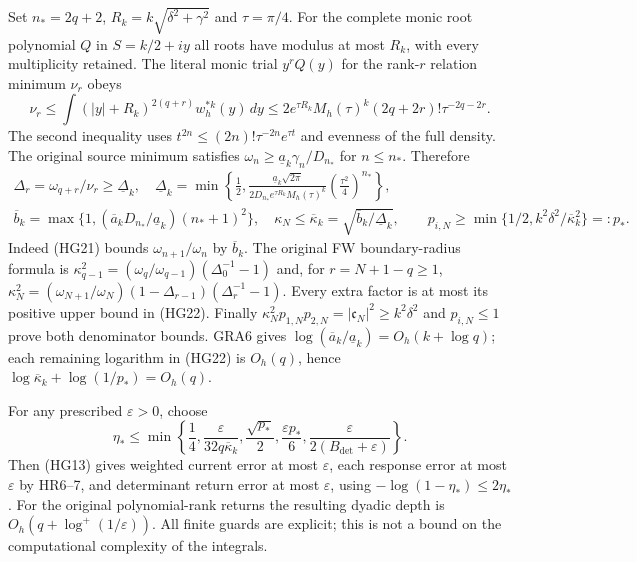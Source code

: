 \documentclass[11pt]{article}
\begin{document}
Set $n_*=2q+2$, $R_k=k\sqrt{\delta^2+\gamma^2}$ and $\tau=\pi/4$.
For the complete monic root polynomial $Q$ in $S=k/2+iy$ all roots
have modulus at most $R_k$, with every multiplicity retained.
The literal monic trial $y^rQ(y)$ for the rank-$r$ relation minimum
$\nu_r$ obeys
\[
\nu_r\le\int(|y|+R_k)^{2(q+r)}w_h^{*k}(y)\,dy
 \le2e^{\tau R_k}M_h(\tau)^k(2q+2r)!\tau^{-2q-2r}.
\]
The second inequality uses $t^{2n}\le(2n)!\tau^{-2n}e^{\tau t}$
and evenness of the full density. The original source minimum
satisfies $\omega_n\ge\underline a_k\gamma_n/D_{n_*}$ for
$n\le n_*$. Therefore
\[
\begin{gathered}
\Delta_r=\omega_{q+r}/\nu_r\ge\underline\Delta_k,
\quad\underline\Delta_k=
\min\left\{\frac12,
\frac{\underline a_k\sqrt{2\pi}}
{2D_{n_*}e^{\tau R_k}M_h(\tau)^k}
\left(\frac{\tau^2}{4}\right)^{n_*}\right\},\\
\overline b_k=\max\{1,
(\overline a_kD_{n_*}/\underline a_k)(n_*+1)^2\},\quad
\kappa_N\le\overline\kappa_k=
\sqrt{\overline b_k/\underline\Delta_k},\qquad
p_{i,N}\ge\min\{1/2,k^2\delta^2/\overline\kappa_k^2\}=:p_*.
\end{gathered}\tag{HG22}
\]
Indeed (HG21) bounds $\omega_{n+1}/\omega_n$ by
$\overline b_k$. The original FW boundary-radius formula is
$\kappa_{q-1}^2=(\omega_q/\omega_{q-1})(\Delta_0^{-1}-1)$ and,
for $r=N+1-q\ge1$,
$\kappa_N^2=(\omega_{N+1}/\omega_N)(1-\Delta_{r-1})(\Delta_r^{-1}-1)$.
Every extra factor is at most its positive upper bound in (HG22).
Finally $\kappa_N^2p_{1,N}p_{2,N}=|\mathfrak c_N|^2\ge k^2\delta^2$
and $p_{i,N}\le1$ prove both denominator bounds.
GRA6 gives $\log(\overline a_k/\underline a_k)=O_h(k+\log q)$;
each remaining logarithm in (HG22) is $O_h(q)$, hence
$\log\overline\kappa_k+\log(1/p_*)=O_h(q)$.

For any prescribed $\varepsilon>0$, choose
\[
\eta_*\le\min\left\{\frac14,\frac{\varepsilon}{32q\overline\kappa_k},
\frac{\sqrt{p_*}}2,\frac{\varepsilon p_*}{6},
\frac{\varepsilon}{2(B_{\det}+\varepsilon)}\right\} .\tag{HG23}
\]
Then (HG13) gives weighted current error at most $\varepsilon$,
each response error at most $\varepsilon$ by HR6--7, and determinant
return error at most $\varepsilon$, using
$-\log(1-\eta_*)\le2\eta_*$.
For the original polynomial-rank returns the resulting dyadic depth
is $O_h(q+\log^+(1/\varepsilon))$. All finite guards are explicit;
this is not a bound on the computational complexity of the integrals.
\end{document}
